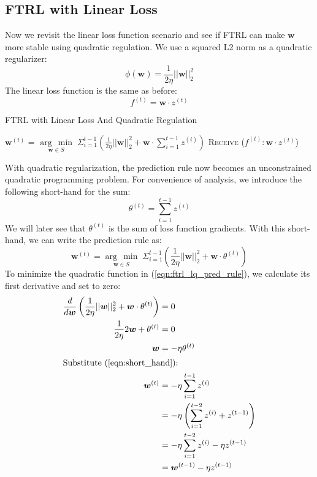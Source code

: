 \documentclass[11pt]{article}
\newcommand{\argmin}[1]{\underset{#1}{\operatorname{arg}\,\operatorname{min}}\;}
\begin{document}
\subsection{FTRL with Linear Loss}
Now we revisit the linear loss function scenario and see if FTRL can make $\bm{w}$ more stable using quadratic regulation. We use a squared L2 norm as a quadratic regularizer:
\begin{equation}
    \phi(\bm{w}) = \frac{1}{2\eta} ||\bm{w}||^2_2
\end{equation}
The linear loss function is the same as before:
\begin{equation}
    f^{(t)} = \bm{w} \cdot z^{(t)}
\end{equation}

\begin{algorithm}[h]
  \caption{FTRL with Linear Loss And Quadratic Regulation}\label{euclid}
  \begin{algorithmic}[1]
        \State $\bm{w}^{(t)}$ = $\argmin{\bm{w} \in S} \Sigma^{t-1}_{i=1} \left( \frac{1}{2\eta} ||\bm{w}||^2_2 + \bm{w} \cdot \sum_{i=1}^{t-1} z^{(i)} \right)$
        \State \textsc{Receive} ($f^{(t)} : \bm{w} \cdot z^{(t)}$)
    \EndFor
    \EndFunction
  \end{algorithmic}
\end{algorithm}
With quadratic regularization, the prediction rule now becomes an unconstrained quadratic programming problem. For convenience of analysis, we introduce the following short-hand for the sum:
\begin{equation}
    \theta^{(t)} = \sum_{i=1}^{t-1} z^{(i)}
    \label{eqn:short_hand}
\end{equation}
We will later see that $\theta^{(t)}$ is the sum of loss function gradients. With this short-hand, we can write the prediction rule as:
\begin{equation}
    \bm{w}^{(t)} = \argmin{\bm{w} \in S} \Sigma^{t-1}_{i=1} \left( \frac{1}{2\eta} ||\bm{w}||^2_2 + \bm{w} \cdot \theta^{(t)} \right)
    \label{eqn:ftrl_lq_pred_rule}
\end{equation}
To minimize the quadratic function in (\ref{eqn:ftrl_lq_pred_rule}), we calculate its first derivative and set to zero:
\begin{align}
    \notag
    \frac{d}{d\bm{w}} \left( \frac{1}{2\eta}||\bm{w}||^2_2 + \bm{w} \cdot \theta^{(t)} \right) &= 0\\
    \notag
    \frac{1}{2\eta} 2 \bm{w} + \theta^{(t)} &= 0\\
    \notag
    \bm{w} &= -\eta \theta^{(t)}\\
    \intertext{Substitute (\ref{eqn:short_hand}):}
    \notag
    \bm{w}^{(t)} &= -\eta \sum_{i=1}^{t-1} z^{(i)}\\
    \notag
    &= -\eta \left( \sum_{i=1}^{t-2} z^{(i)} + z^{(t-1)} \right)\\
    \notag
    &= -\eta \sum_{i=1}^{t-2} z^{(i)} - \eta z^{(t-1)}\\
    \label{eqn:ftrl_quad_update}
    &= \bm{w}^{(t-1)} - \eta z^{(t-1)}
\end{align}
\end{document}
